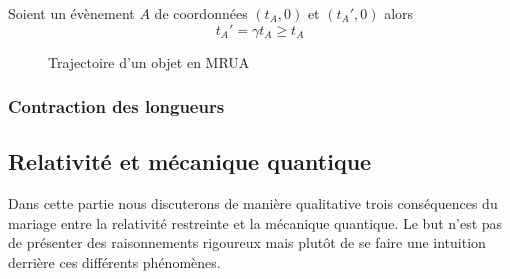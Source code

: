 \documentclass[a4paper,11pt]{report}
\begin{document}
                Soient un évènement $A$ de coordonnées $(t_A,0)$ et $(t_A',0)$ alors
                \begin{equation}
                    t_A' = \gamma t_A \geq t_A
                \end{equation}
            
                \begin{figure}[H]
                \centering
                \caption{Trajectoire d'un objet en MRUA}
                \end{figure}
            
            \subsubsection{Contraction des longueurs}
            
                \comp
            
        \subsection{Relativité et mécanique quantique}
            
            Dans cette partie nous discuterons de manière qualitative trois conséquences du mariage entre la relativité restreinte et la mécanique quantique. Le but n'est pas de présenter des raisonnements rigoureux mais plutôt de se faire une intuition derrière ces différents phénomènes.\\
            
\end{document}
